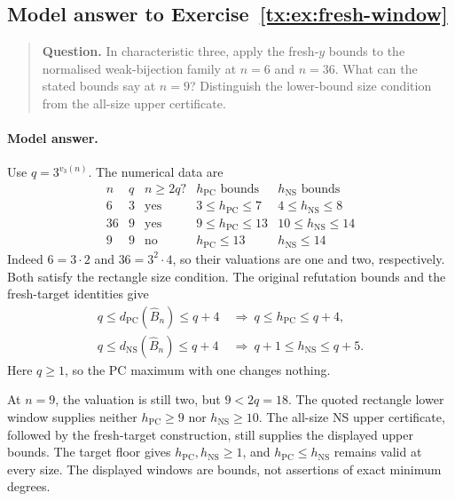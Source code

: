 \documentclass[11pt,a4paper,oneside,openany]{book}
\theoremstyle{definition}\newtheorem{definition}[theorem]{Definition}
\theoremstyle{remark}\newtheorem{remark}[theorem]{Remark}
\newcommand{\NS}{\mathrm{NS}}\newcommand{\PC}{\mathrm{PC}}
\numberwithin{equation}{chapter}
\begin{document}
\begin{samepage}

\subsection*{Model answer to Exercise~\ref{tx:ex:fresh-window}}\label{tx:ans:fresh-window}

\begin{quote}\small\textbf{Question.} In characteristic three, apply the fresh-$y$ bounds to the normalised
weak-bijection family at $n=6$ and $n=36$. What can the stated bounds
say at $n=9$? Distinguish the lower-bound size condition from the
all-size upper certificate.
\end{quote}

\paragraph{Model answer.}
Use \(q=3^{v_3(n)}\). The numerical data are
\[
 \begin{array}{c|c|c|c|c}
 n&q&n\ge2q?&h_{\PC}\text{ bounds}&h_{\NS}\text{ bounds}\\ \hline
 6&3&\text{yes}&3\le h_{\PC}\le7&4\le h_{\NS}\le8\\
 36&9&\text{yes}&9\le h_{\PC}\le13&10\le h_{\NS}\le14\\
 9&9&\text{no}&h_{\PC}\le13&h_{\NS}\le14
 \end{array}
\]
Indeed \(6=3\cdot2\) and \(36=3^2\cdot4\), so their valuations
are one and two, respectively. Both satisfy the rectangle size
condition. The original refutation bounds and the fresh-target
identities give
\[
 \begin{aligned}
 q\le d_{\PC}(\widehat B_n)\le q+4
   &\ \Longrightarrow\ q\le h_{\PC}\le q+4,\\
 q\le d_{\NS}(\widehat B_n)\le q+4
   &\ \Longrightarrow\ q+1\le h_{\NS}\le q+5.
 \end{aligned}
\]
Here \(q\ge1\), so the PC maximum with one changes nothing.
\end{samepage}

At \(n=9\), the valuation is still two, but \(9<2q=18\).
The quoted rectangle lower window supplies neither \(h_{\PC}\ge9\)
nor \(h_{\NS}\ge10\). The all-size NS upper certificate, followed
by the fresh-target construction, still supplies the displayed
upper bounds. The target floor gives \(h_{\PC},h_{\NS}\ge1\),
and \(h_{\PC}\le h_{\NS}\) remains valid at every size.
The displayed windows are bounds, not assertions of exact minimum degrees.
\end{document}
